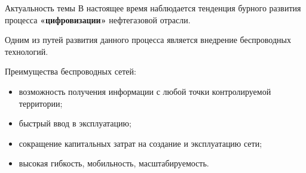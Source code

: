 \begin{frame}
    {Актуальность темы}
    \justifying
    В настоящее время наблюдается тенденция бурного развития процесса \textbf{«цифровизации»} нефтегазовой отрасли.
    
    \bigskip

    Одним из путей развития данного процесса является внедрение беспроводных технологий.
    \bigskip

    Преимущества беспроводных сетей:
    \begin{itemize}
        \item возможность получения информации с любой точки контролируемой территории;
        \item быстрый ввод в эксплуатацию;
        \item сокращение капитальных затрат на создание и эксплуатацию сети; 
        \item высокая гибкость, мобильность, масштабируемость.
    \end{itemize}

    
\end{frame}


